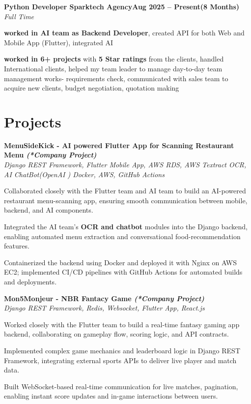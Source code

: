 \documentclass[letterpaper,10pt]{article}
\newcommand{\heading}[2]{
  \hspace{10pt}#1\hfill#2\\
}
\newcommand{\headingBf}[2]{
  \heading{\textbf{#1}}{\textbf{#2}}
}
\newcommand{\headingIt}[2]{
  \heading{\textit{#1}}{\textit{#2}}
}
\newenvironment{resume_list}{
  \vspace{-7pt}
  \begin{itemize}[itemsep=-2px, parsep=1pt, leftmargin=30pt]
}{
  \end{itemize}
}
\begin{document}
  \headingBf{Python Developer \textbar Sparktech Agency}{Aug 2025 -- Present(8 Months)}
  \headingIt{Full Time}{}
  \begin{resume_list}
    \item \textbf{worked in AI team as Backend Developer}, created API for both Web and Mobile App (Flutter), integrated AI
    \item \textbf{worked in 6+ projects} with \textbf{5 Star ratings} from the clients, handled International clients, helped my team leader to manage day-to-day team management works- requirements check, communicated with sales team to acquire new clients, budget negotiation, quotation making
  \end{resume_list}





\section{Projects}


\headingBf{MenuSideKick - AI powered Flutter App for Scanning Restaurant Menu \textit{(*Company Project)}}{}

\headingIt{Django REST Framework, Flutter Mobile App, AWS RDS, AWS Textract OCR, AI ChatBot(OpenAI
) Docker, AWS, GitHub Actions}{}
\begin{resume_list}
    \item Collaborated closely with the Flutter team and AI team to build an AI-powered restaurant menu-scanning app, ensuring smooth communication between mobile, backend, and AI components.
    \item Integrated the AI team’s \textbf{OCR and chatbot} modules into the Django backend, enabling automated menu extraction and conversational food-recommendation features.
    \item Containerized the backend using Docker and deployed it with Nginx on AWS EC2; implemented CI/CD pipelines with GitHub Actions for automated builds and deployments.
\end{resume_list}

\headingBf{Mon5Monjeur - NBR Fantacy Game \textit{(*Company Project)}}{}

\headingIt{Django REST Framework, Redis, Websocket, Flutter App, React.js}{}
\begin{resume_list}
    \item Worked closely with the Flutter team to build a real-time fantasy gaming app backend, collaborating on gameplay flow, scoring logic, and API contracts.
    \item Implemented complex game mechanics and leaderboard logic in Django REST Framework, integrating external sports APIs to deliver live player and match data.
    \item Built WebSocket-based real-time communication for live matches, pagination, enabling instant score updates and in-game interactions between users.
\end{resume_list}
\end{document}
